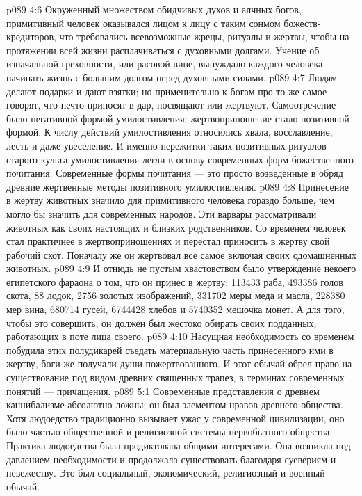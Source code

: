 \vs p089 4:6 Окруженный множеством обидчивых духов и алчных богов, примитивный человек оказывался лицом к лицу с таким сонмом божеств\hyp{}кредиторов, что требовались всевозможные жрецы, ритуалы и жертвы, чтобы на протяжении всей жизни расплачиваться с духовными долгами. Учение об изначальной греховности, или расовой вине, вынуждало каждого человека начинать жизнь с большим долгом перед духовными силами.
\vs p089 4:7 \pc Людям делают подарки и дают взятки; но применительно к богам про то же самое говорят, что нечто приносят в дар, посвящают или жертвуют. Самоотречение было негативной формой умилостивления; жертвоприношение стало позитивной формой. К числу действий умилостивления относились хвала, восславление, лесть и даже увеселение. И именно пережитки таких позитивных ритуалов старого культа умилостивления легли в основу современных форм божественного почитания. Современные формы почитания --- это просто возведенные в обряд древние жертвенные методы позитивного умилостивления.
\vs p089 4:8 \pc Принесение в жертву животных значило для примитивного человека гораздо больше, чем могло бы значить для современных народов. Эти варвары рассматривали животных как своих настоящих и близких родственников. Со временем человек стал практичнее в жертвоприношениях и перестал приносить в жертву свой рабочий скот. Поначалу же он жертвовал все самое  включая своих одомашненных животных.
\vs p089 4:9 И отнюдь не пустым хвастовством было утверждение некоего египетского фараона о том, что он принес в жертву: 113433 раба, 493386 голов скота, 88 лодок, 2756 золотых изображений, 331702 меры меда и масла, 228380 мер вина, 680714 гусей, 6744428 хлебов и 5740352 мешочка монет. А для того, чтобы это совершить, он должен был жестоко обирать своих подданных, работающих в поте лица своего.
\vs p089 4:10 Насущная необходимость со временем побудила этих полудикарей съедать материальную часть принесенного ими в жертву, боги же получали души пожертвованного. И этот обычай обрел право на существование под видом древних священных трапез, в терминах современных понятий --- причащения.
\vs p089 5:1 Современные представления о древнем каннибализме абсолютно ложны; он был элементом нравов древнего общества. Хотя людоедство традиционно вызывает ужас у современной цивилизации, оно было частью общественной и религиозной системы первобытного общества. Практика людоедства была продиктована общими интересами. Она возникла под давлением необходимости и продолжала существовать благодаря суевериям и невежеству. Это был социальный, экономический, религиозный и военный обычай.
